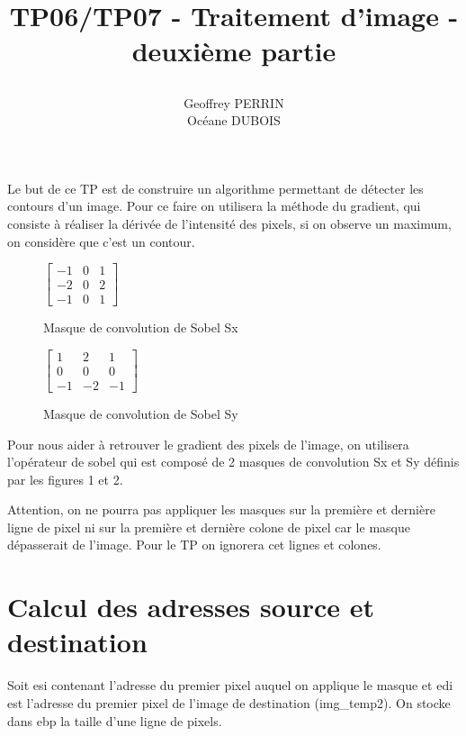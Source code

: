 \documentclass[11pt]{report}
\title{\textbf{TP06/TP07 - Traitement d'image - deuxième partie }
\author{Geoffrey PERRIN \\ Océane DUBOIS\\}
\date{}}
\begin{document}
\maketitle

\newpage

Le but de ce TP est de construire un algorithme permettant de détecter les contours d'un image. Pour ce faire on utilisera la méthode du gradient, qui consiste à réaliser la dérivée de l'intensité des pixels, si on observe un maximum, on considère que c'est un contour.


\begin{figure}[h]
\begin{center}
$
\begin{bmatrix}
-1 & 0 & 1 \\
-2 & 0 & 2 \\
-1 & 0 & 1 
\end{bmatrix}
$
\end{center}
\label{sx}
\caption{Masque de convolution de Sobel Sx}
\end{figure}


\begin{figure}[h]
\begin{center}
$
\begin{bmatrix}
1 & 2 & 1 \\
0 & 0 & 0 \\
-1 & -2 & -1 
\end{bmatrix}
$
\label{sy}
\end{center}
\caption{Masque de convolution de Sobel Sy}
\end{figure}


Pour nous aider à retrouver le gradient des pixels de l'image, on utilisera l'opérateur de sobel qui est composé de 2 masques de convolution Sx et Sy définis par les figures 1 et 2.

Attention, on ne pourra pas appliquer les masques sur la première et dernière ligne de pixel ni sur la première et dernière colone de pixel car le masque dépasserait de l'image. Pour le TP on ignorera cet lignes et colones. 


\section{Calcul des adresses source et destination}

Soit esi contenant l'adresse du premier pixel auquel on applique le masque et edi est l'adresse du premier pixel de l'image de destination (img\_temp2). On stocke dans ebp la taille d'une ligne de pixels.
\end{document}

